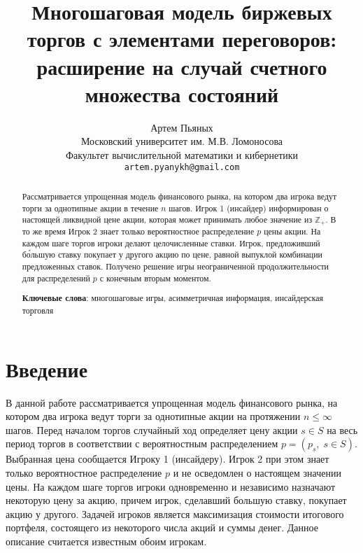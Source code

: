\documentclass[12pt, draft]{extarticle}
\begin{document}
\title{Многошаговая модель биржевых торгов с элементами переговоров: расширение
  на случай счетного множества состояний%
}%
\author{%
  Артем Пьяных\\
  Московский университет им. М.В. Ломоносова\\
  Факультет вычислительной математики и кибернетики\\
  \texttt{artem.pyanykh@gmail.com}%
}%
\maketitle

\begin{abstract}
  Рассматривается упрощенная модель финансового рынка, на котором два игрока
  ведут торги за однотипные акции в течение $n$ шагов. Игрок 1 (инсайдер)
  информирован о настоящей ликвидной цене акции, которая может принимать любое
  значение из $\mathbb{Z}_+$. В то же время Игрок 2 знает только вероятностное
  распределение $p$ цены акции. На каждом шаге торгов игроки делают
  целочисленные ставки. Игрок, предложивший б\'{о}льшую ставку покупает у
  другого акцию по цене, равной выпуклой комбинации предложенных ставок.
  Получено решение игры неограниченной продолжительности для распределений $p$ с
  конечным вторым моментом.

  \textbf{Ключевые слова}: многошаговые игры, асимметричная информация,
  инсайдерская торговля
\end{abstract}

\section{Введение}
\label{sec:intro}

В данной работе рассматривается упрощенная модель финансового рынка, на котором
два игрока ведут торги за однотипные акции на протяжении $n \leqslant \infty$
шагов. Перед началом торгов случайный ход определяет цену акции $s \in S$ на
весь период торгов в соответствии с вероятностным распределением $p = (p_s, \; s
\in S)$. Выбранная цена сообщается Игроку 1 (инсайдеру). Игрок 2 при этом знает
только вероятностное распределение $p$ и не осведомлен о настоящем значении
цены. На каждом шаге торгов игроки одновременно и независимо назначают некоторую
цену за акцию, причем игрок, сделавший большую ставку, покупает акцию у другого.
Задачей игроков является максимизация стоимости итогового портфеля, состоящего
из некоторого числа акций и суммы денег. Данное описание считается известным
обоим игрокам.
\end{document}
